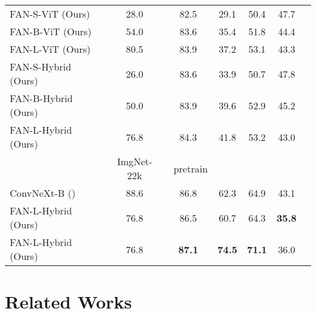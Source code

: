 \documentclass[nohyperref]{article}
\theoremstyle{plain}
\theoremstyle{definition}
\theoremstyle{remark}
\begin{document}
\begin{table}[t]
{\begin{tabular}{l|cccccc  }
        \midrule
        {FAN-S-ViT}  (Ours) &  28.0 
        & 82.5 
        & 29.1 &  50.4 & {47.7} \\
        {FAN-B-ViT}  (Ours) &  54.0  
        & 83.6 
        & {35.4}  &  {51.8} & {44.4} \\
        {FAN-L-ViT  (Ours)}  &   80.5  
        & {83.9} 
        & {37.2} &  {53.1} &  {43.3}  \\
        \midrule
        {FAN-S-Hybrid}  (Ours) &  26.0 
        & 83.6
        & 33.9 &  50.7 & {47.8} \\
        {FAN-B-Hybrid}  (Ours) &  50.0  
        & 83.9
        & {39.6}  &  {52.9} & {45.2} \\
        {FAN-L-Hybrid  (Ours)}  &   76.8  
        & {84.3} 
        & {41.8} &  {53.2} &  {43.0}  \\
        \midrule
        & \quad  ImgNet-22k & ~pretrain  \\
        \midrule
        {ConvNeXt-B} (\citeauthor{liu2022convnet}) &  88.6  
        & 86.8 
        & {62.3}  &  {64.9} & {43.1} \\
        \midrule
        {FAN-L-Hybrid  (Ours)}  &   76.8  
        & {86.5} 
        & {60.7} &  {64.3} &  \textbf{35.8}  \\
        {FAN-L-Hybrid  (Ours)}  &   76.8  
        & \textbf{87.1} 
        & \textbf{74.5} &  \textbf{71.1} &  {36.0}  \\
    \end{tabular}
} 
\label{tab:generalization}
\vspace{-4mm}
\end{table}  \section{Related Works}
\end{document}
